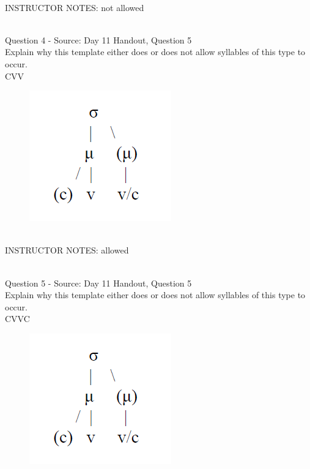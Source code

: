 \documentclass[12pt]{article}
\begin{document}
~\\
INSTRUCTOR NOTES: not allowed


~\\

{\large Question 4} - Source: Day 11 Handout, Question 5\\

Explain why this template either does or does not allow syllables of this type to occur.\\

CVV

\begin{figure}[H]
\includegraphics{../images/ponapean_syllabletemplate.png}
\end{figure}

~\\
INSTRUCTOR NOTES: allowed


~\\

{\large Question 5} - Source: Day 11 Handout, Question 5\\

Explain why this template either does or does not allow syllables of this type to occur.\\

CVVC

\begin{figure}[H]
\includegraphics{../images/ponapean_syllabletemplate.png}
\end{figure}
\end{document}
